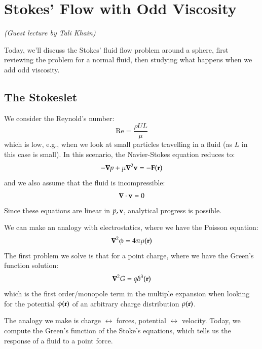 \section{Stokes' Flow with Odd Viscosity}

\emph{(Guest lecture by Tali Khain)}

Today, we'll discuss the Stokes' fluid flow problem around a sphere, first reviewing the problem for a normal fluid, then studying what happens when we add odd viscosity.

\subsection{The Stokeslet}
We consider the Reynold's number:
\begin{equation}
    \text{Re} = \frac{\rho U L}{\mu}
\end{equation}
which is low, e.g., when we look at small particles travelling in a fluid (as $L$ in this case is small). In this scenario, the Navier-Stokes equation reduces to:
\begin{equation}
    -\nabla p + \mu \nabla^2 \v{v} = -\v{F}(\v{r})
\end{equation}
and we also assume that the fluid is incompressible:
\begin{equation}
    \nabla \cdot \v{v} = 0
\end{equation}
Since these equations are linear in $p, \mathbf{v}$, analytical progress is possible. 

We can make an analogy with electrostatics, where we have the Poisson equation:
\begin{equation}
    \nabla^2 \phi = 4\pi \rho(\v{r})
\end{equation}
The first problem we solve is that for a point charge, where we have the Green's function solution:
\begin{equation}
    \nabla^2 G = q\delta^3(\v{r})
\end{equation}
which is the first order/monopole term in the multiple expansion when looking for the potential $\phi(\mathbf{r})$ of an arbitrary charge distribution $\rho(\mathbf{r})$.

The analogy we make is charge $\leftrightarrow$ forces, potential $\leftrightarrow $ velocity. Today, we compute the Green's function of the Stoke's equations, which tells us the response of a fluid to a point force.

